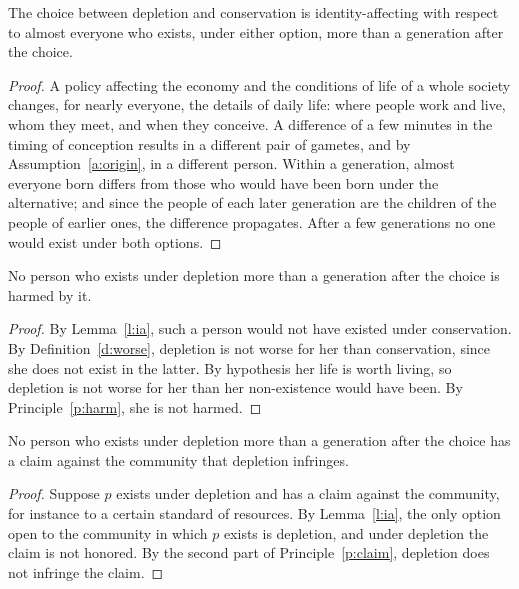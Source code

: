 \documentclass{situationist-preprint}
\begin{document}
\begin{lemma}\label{l:ia}
The choice between depletion and conservation is identity-affecting with respect to almost everyone who exists, under either option, more than a generation after the choice.
\end{lemma}

\begin{proof}
A policy affecting the economy and the conditions of life of a whole society changes, for nearly everyone, the details of daily life: where people work and live, whom they meet, and when they conceive. A difference of a few minutes in the timing of conception results in a different pair of gametes, and by Assumption~\ref{a:origin}, in a different person. Within a generation, almost everyone born differs from those who would have been born under the alternative; and since the people of each later generation are the children of the people of earlier ones, the difference propagates. After a few generations no one would exist under both options.
\end{proof}

\begin{lemma}\label{l:noharm}
No person who exists under depletion more than a generation after the choice is harmed by it.
\end{lemma}

\begin{proof}
By Lemma~\ref{l:ia}, such a person would not have existed under conservation. By Definition~\ref{d:worse}, depletion is not worse for her than conservation, since she does not exist in the latter. By hypothesis her life is worth living, so depletion is not worse for her than her non-existence would have been. By Principle~\ref{p:harm}, she is not harmed.
\end{proof}

\begin{lemma}\label{l:noclaim}
No person who exists under depletion more than a generation after the choice has a claim against the community that depletion infringes.
\end{lemma}

\begin{proof}
Suppose $p$ exists under depletion and has a claim against the community, for instance to a certain standard of resources. By Lemma~\ref{l:ia}, the only option open to the community in which $p$ exists is depletion, and under depletion the claim is not honored. By the second part of Principle~\ref{p:claim}, depletion does not infringe the claim.
\end{proof}
\end{document}
